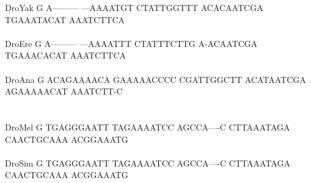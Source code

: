 \documentclass[11pt,twoside,reqno,a4paper]{article}
\begin{document}
{DroYak	G	A---------	---AAAATGT	CTATTGGTTT	ACACAATCGA	TGAAATACAT	AAATCTTCA\\
\hspace*{7\charwidth}\hspace*{1\charwidth}\hspace*{1\charwidth}\hspace*{1\charwidth}\hspace*{1\charwidth}\hspace*{1\charwidth}\hspace*{1\charwidth}\\
DroEre	G	A---------	---AAAATTT	CTATTTCTTG	A-ACAATCGA	TGAAACACAT	AAATCTTCA\\
\hspace*{7\charwidth}\hspace*{1\charwidth}\hspace*{1\charwidth}\hspace*{1\charwidth}\hspace*{1\charwidth}\hspace*{1\charwidth}\hspace*{1\charwidth}\\
DroAna	G	ACAGAAAACA	GAAAAACCCC	CGATTGGCTT	ACATAATCGA	AGAAAAACAT	AAATCTT-C\\
\hspace*{7\charwidth}\hspace*{1\charwidth}\hspace*{1\charwidth}\hspace*{1\charwidth}\hspace*{1\charwidth}\hspace*{1\charwidth}\hspace*{1\charwidth}\\
\\
DroMel	G	TGAGGGAATT	TAGAAAATCC	AGCCA----C	CTTAAATAGA	CAACTGCAAA	ACGGAAATG\\
\hspace*{7\charwidth}\hspace*{1\charwidth}\hspace*{1\charwidth}\hspace*{1\charwidth}\hspace*{1\charwidth}\hspace*{1\charwidth}\hspace*{1\charwidth}\\
DroSim	G	TGAGGGAATT	TAGAAAATCC	AGCCA----C	CTTAAATAGA	CAACTGCAAA	ACGGAAATG\\
\hspace*{7\charwidth}\hspace*{1\charwidth}\hspace*{1\charwidth}\hspace*{1\charwidth}\hspace*{1\charwidth}\hspace*{1\charwidth}\hspace*{1\charwidth}\\
}
\end{document}
